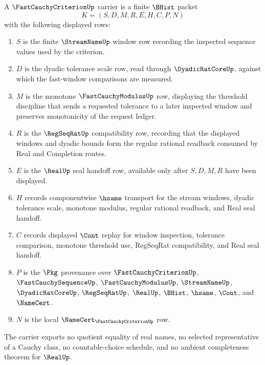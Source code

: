 \begin{definition}
\label{def:fast-cauchy-criterion-carrier}
A $\FastCauchyCriterionUp$ carrier is a finite $\BHist$ packet
$$
K=(S,D,M,R,E,H,C,P,N)
$$
with the following displayed rows:
\begin{enumerate}
\item $S$ is the finite $\StreamNameUp$ window row recording the inspected sequence values used by the criterion.
\item $D$ is the dyadic tolerance scale row, read through $\DyadicRatCoreUp$, against which the fast-window comparisons are measured.
\item $M$ is the monotone $\FastCauchyModulusUp$ row, displaying the threshold discipline that sends a requested tolerance to a later inspected window and preserves monotonicity of the request ledger.
\item $R$ is the $\RegSeqRatUp$ compatibility row, recording that the displayed windows and dyadic bounds form the regular rational readback consumed by Real and Completion routes.
\item $E$ is the $\RealUp$ seal handoff row, available only after $S,D,M,R$ have been displayed.
\item $H$ records componentwise $\hsame$ transport for the stream windows, dyadic tolerance scale, monotone modulus, regular rational readback, and Real seal handoff.
\item $C$ records displayed $\Cont$ replay for window inspection, tolerance comparison, monotone threshold use, RegSeqRat compatibility, and Real seal handoff.
\item $P$ is the $\Pkg$ provenance over $\FastCauchyCriterionUp$, $\FastCauchySequenceUp$, $\FastCauchyModulusUp$, $\StreamNameUp$, $\DyadicRatCoreUp$, $\RegSeqRatUp$, $\RealUp$, $\BHist$, $\hsame$, $\Cont$, and $\NameCert$.
\item $N$ is the local $\NameCert_{\FastCauchyCriterionUp}$ row.
\end{enumerate}
The carrier exports no quotient equality of real names, no selected representative of a Cauchy class, no countable-choice schedule, and no ambient completeness theorem for $\RealUp$.
\end{definition}


